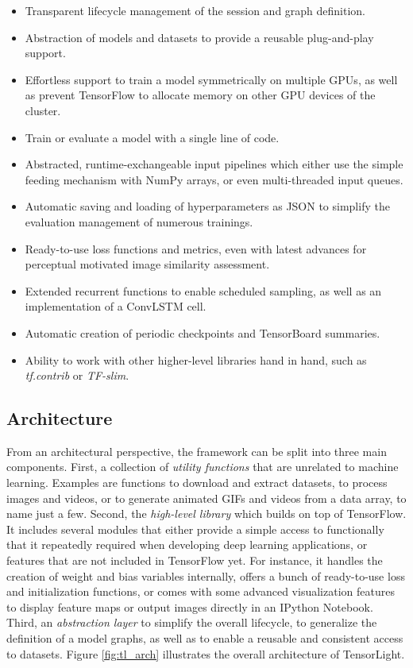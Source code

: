 \begin{itemize}
\item Transparent lifecycle management of the session and graph definition.
\item Abstraction of models and datasets to provide a reusable plug-and-play support.
\item Effortless support to train a model symmetrically on multiple GPUs, as well as prevent TensorFlow to allocate memory on other GPU devices of the cluster.
\item Train or evaluate a model with a single line of code.
\item Abstracted, runtime-exchangeable input pipelines which either use the simple feeding mechanism with NumPy arrays, or even multi-threaded input queues.
\item Automatic saving and loading of hyperparameters as JSON to simplify the evaluation management of numerous trainings.
\item Ready-to-use loss functions and metrics, even with latest advances for perceptual motivated image similarity assessment.
\item Extended recurrent functions to enable scheduled sampling, as well as an implementation of a ConvLSTM cell.
\item Automatic creation of periodic checkpoints and TensorBoard summaries.
\item Ability to work with other higher-level libraries hand in hand, such as \textit{tf.contrib} or \textit{TF-slim}.
\end{itemize}


\subsection{Architecture}

From an architectural perspective, the framework can be split into three main components. First, a collection of \textit{utility functions} that are unrelated to machine learning. Examples are functions to download and extract datasets, to process images and videos, or to generate animated GIFs and videos from a data array, to name just a few. Second, the \textit{high-level library} which builds on top of TensorFlow. It includes several modules that either provide a simple access to functionally that it repeatedly required when developing deep learning applications, or features that are not included in TensorFlow yet. For instance, it handles the creation of weight and bias variables internally, offers a bunch of ready-to-use loss and initialization functions, or comes with some advanced visualization features to display feature maps or output images directly in an IPython Notebook. Third, an \textit{abstraction layer} to simplify the overall lifecycle, to generalize the definition of a model graphs, as well as to enable a reusable and consistent access to datasets. Figure \ref{fig:tl_arch} illustrates the overall architecture of TensorLight.


